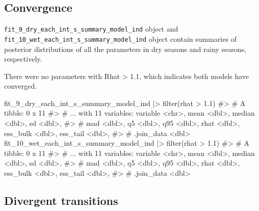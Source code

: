 \documentclass[
  11pt,
  letterpaper,
  DIV=11,
  numbers=noendperiod]{scrartcl}
\newenvironment{Shaded}{}{}
\newcommand{\CommentTok}[1]{\textcolor[rgb]{0.42,0.45,0.49}{#1}}
\newcommand{\FloatTok}[1]{\textcolor[rgb]{0.00,0.36,0.77}{#1}}
\newcommand{\FunctionTok}[1]{\textcolor[rgb]{0.44,0.26,0.76}{#1}}
\newcommand{\NormalTok}[1]{\textcolor[rgb]{0.14,0.16,0.18}{#1}}
\newcommand{\SpecialCharTok}[1]{\textcolor[rgb]{0.00,0.36,0.77}{#1}}
\begin{document}
\hypertarget{convergence}{%
\subsection{Convergence}\label{convergence}}

\texttt{fit\_9\_dry\_each\_int\_s\_summary\_model\_ind} object and
\texttt{fit\_10\_wet\_each\_int\_s\_summary\_model\_ind} object contain
summaries of posterior distributions of all the parameters in dry
seasons and rainy seasons, respectively.

There were no parameters with Rhat \textgreater{} 1.1, which indicates
both models have converged.

\begin{Shaded}
\begin{Highlighting}[]
\NormalTok{fit\_9\_dry\_each\_int\_s\_summary\_model\_ind }\SpecialCharTok{|\textgreater{}} \FunctionTok{filter}\NormalTok{(rhat }\SpecialCharTok{\textgreater{}} \FloatTok{1.1}\NormalTok{)}
\CommentTok{\#\textgreater{} \# A tibble: 0 x 11}
\CommentTok{\#\textgreater{} \# ... with 11 variables: variable \textless{}chr\textgreater{}, mean \textless{}dbl\textgreater{}, median \textless{}dbl\textgreater{}, sd \textless{}dbl\textgreater{},}
\CommentTok{\#\textgreater{} \#   mad \textless{}dbl\textgreater{}, q5 \textless{}dbl\textgreater{}, q95 \textless{}dbl\textgreater{}, rhat \textless{}dbl\textgreater{}, ess\_bulk \textless{}dbl\textgreater{}, ess\_tail \textless{}dbl\textgreater{},}
\CommentTok{\#\textgreater{} \#   .join\_data \textless{}dbl\textgreater{}}
\NormalTok{fit\_10\_wet\_each\_int\_s\_summary\_model\_ind }\SpecialCharTok{|\textgreater{}} \FunctionTok{filter}\NormalTok{(rhat }\SpecialCharTok{\textgreater{}} \FloatTok{1.1}\NormalTok{)}
\CommentTok{\#\textgreater{} \# A tibble: 0 x 11}
\CommentTok{\#\textgreater{} \# ... with 11 variables: variable \textless{}chr\textgreater{}, mean \textless{}dbl\textgreater{}, median \textless{}dbl\textgreater{}, sd \textless{}dbl\textgreater{},}
\CommentTok{\#\textgreater{} \#   mad \textless{}dbl\textgreater{}, q5 \textless{}dbl\textgreater{}, q95 \textless{}dbl\textgreater{}, rhat \textless{}dbl\textgreater{}, ess\_bulk \textless{}dbl\textgreater{}, ess\_tail \textless{}dbl\textgreater{},}
\CommentTok{\#\textgreater{} \#   .join\_data \textless{}dbl\textgreater{}}
\end{Highlighting}
\end{Shaded}

\hypertarget{divergent-transitions}{%
\subsection{Divergent transitions}\label{divergent-transitions}}
\end{document}
